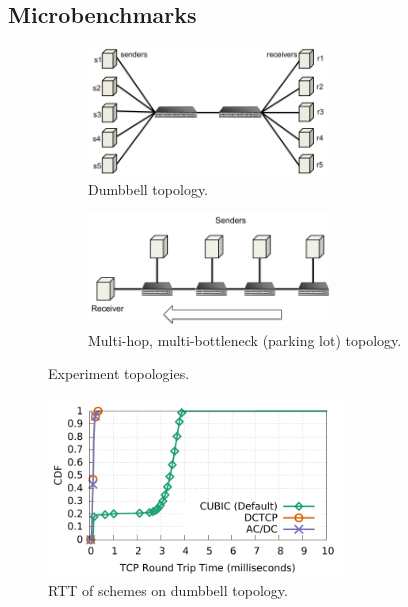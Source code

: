 \subsection{Microbenchmarks}
\label{micro}
\begin{figure}[!t]
        \centering
        \begin{subfigure}[b]{0.7\textwidth}
                \centering
                \includegraphics[width=0.7\textwidth]{acdctcp/figures/dumbbell_topology.pdf}
                \caption{Dumbbell topology.}
                \label{dumbbell_topology}
        \end{subfigure}
        \begin{subfigure}[b]{0.7\textwidth}
                \centering
                \includegraphics[width=0.7\textwidth]{acdctcp/figures/parkinglot_topology.pdf}
                \caption{Multi-hop, multi-bottleneck (parking lot) topology.}
                \label{parkinglot_topology}
        \end{subfigure}
        \caption{Experiment topologies.}
        \label{microbenchmarks_topology}
\end{figure}


\begin{figure}[!t]
        \centering
  \includegraphics[width=0.7\textwidth]{acdctcp/figures/convergence/flowcontrolOFF_sockperf/convergence_test_sockperf.pdf}
        \caption{RTT of schemes on dumbbell topology.}
        \label{sockperf_convergence}
\end{figure}

